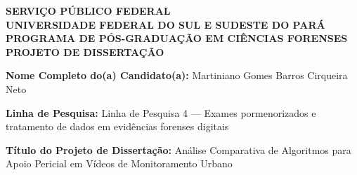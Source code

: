 
\begin{center}
    {\bfseries\large SERVIÇO PÚBLICO FEDERAL}\\
    {\bfseries\large UNIVERSIDADE FEDERAL DO SUL E SUDESTE DO PARÁ}\\
    {\bfseries\large PROGRAMA DE PÓS-GRADUAÇÃO EM CIÊNCIAS FORENSES}\\[0.5em]
    {\bfseries PROJETO DE DISSERTAÇÃO}
\end{center}

\vspace{1.5em}

\noindent\textbf{Nome Completo do(a) Candidato(a):} Martiniano Gomes Barros Cirqueira Neto

\vspace{0.8em}
\noindent\textbf{Linha de Pesquisa:} Linha de Pesquisa 4 --- Exames pormenorizados e tratamento de dados em evidências forenses digitais

\vspace{0.8em}
\noindent\textbf{Título do Projeto de Dissertação:} Análise Comparativa de Algoritmos para Apoio Pericial em Vídeos de Monitoramento Urbano

\vspace{1.5em}
